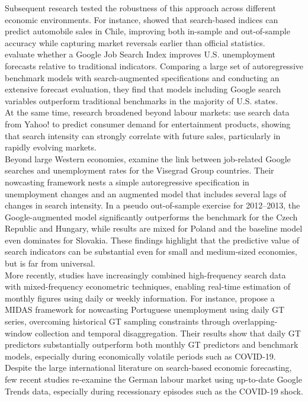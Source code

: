 \documentclass[12pt,a4paper]{article}
\begin{document}
Subsequent research tested the robustness of this approach across different economic environments. For instance, \citet{carrier} showed that search-based indices can predict automobile sales in Chile, improving both in-sample and out-of-sample accuracy while capturing market reversals earlier than official statistics. 
\\
 \citet{D'Amuri2010Google} evaluate whether a Google Job Search Index improves U.S. unemployment forecasts relative to traditional indicators. Comparing a large set of autoregressive benchmark models with search-augmented specifications and conducting an extensive forecast evaluation, they find that models including Google search variables outperform traditional benchmarks in the majority of U.S. states.
\\
At the same time, research broadened beyond labour markets: \citet{goel} use search data from Yahoo! to predict consumer demand for entertainment products, showing that search intensity can strongly correlate with future sales, particularly in rapidly evolving markets.\\
Beyond large Western economies, \citet{check} examine the link between job-related Google searches and unemployment rates for the Visegrad Group countries. Their nowcasting framework nests a simple autoregressive specification in unemployment changes and an augmented model that includes several lags of changes in search intensity. In a pseudo out-of-sample exercise for 2012–2013, the Google-augmented model significantly outperforms the benchmark for the Czech Republic and Hungary, while results are mixed for Poland and the baseline model even dominates for Slovakia. These findings highlight that the predictive value of search indicators can be substantial even for small and medium-sized economies, but is far from universal.
\\
More recently, studies have increasingly combined high-frequency search data with mixed-frequency econometric techniques, enabling real-time estimation of monthly figures using daily or weekly information. For instance, \citet{COSTA2024101963} propose a MIDAS framework for nowcasting Portuguese unemployment using daily GT series, overcoming historical GT sampling constraints through overlapping-window collection and temporal disaggregation. Their results show that daily GT predictors substantially outperform both monthly GT predictors and benchmark models, especially during economically volatile periods such as COVID-19. \\
Despite the large international literature on search-based economic forecasting, few recent studies re-examine the German labour market using up-to-date Google Trends data, especially during recessionary episodes such as the COVID-19 shock. \\
\end{document}
